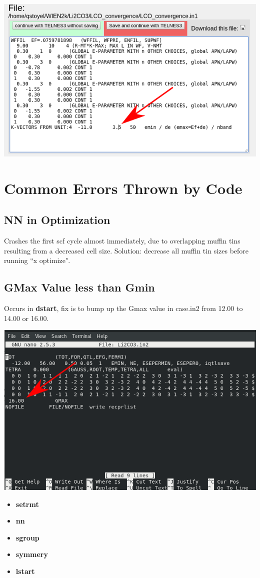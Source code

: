 \documentclass[12pt]{article}
\begin{document}
\includegraphics[scale=0.4]{./images/in1_edit.png}


\section{Common Errors Thrown by Code}

\subsection{NN in Optimization}
Crashes the first scf cycle almost immediately, due to overlapping muffin tins resulting from a decreased cell size.  Solution: decrease all muffin tin sizes before running ``x optimize".


\subsection{GMax Value less than Gmin}

Occurs in \textbf{dstart}, fix is to bump up the Gmax value in case.in2 from 12.00 to 14.00 or 16.00.

\includegraphics[scale=0.5]{./images/gmax_err.png}



\begin{itemize}
	\item \textbf{setrmt}
	\item \textbf{nn}
	\item \textbf{sgroup}
	\item  \textbf{symmery}
	\item \textbf{lstart}
	
\end{itemize}
\end{document}
